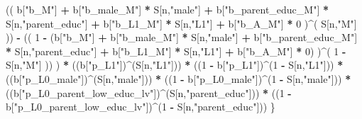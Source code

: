 \documentclass[
]{book}
\newenvironment{Shaded}{\begin{snugshade}}{\end{snugshade}}
\newcommand{\DecValTok}[1]{\textcolor[rgb]{0.00,0.00,0.81}{#1}}
\newcommand{\NormalTok}[1]{#1}
\newcommand{\SpecialCharTok}[1]{\textcolor[rgb]{0.81,0.36,0.00}{\textbf{#1}}}
\newcommand{\StringTok}[1]{\textcolor[rgb]{0.31,0.60,0.02}{#1}}
\begin{document}
\begin{Shaded}
\begin{Highlighting}[]
\NormalTok{          (( b[}\StringTok{"b\_M"}\NormalTok{] }\SpecialCharTok{+} 
\NormalTok{               b[}\StringTok{"b\_male\_M"}\NormalTok{] }\SpecialCharTok{*}\NormalTok{ S[n,}\StringTok{"male"}\NormalTok{] }\SpecialCharTok{+} 
\NormalTok{               b[}\StringTok{"b\_parent\_educ\_M"}\NormalTok{] }\SpecialCharTok{*}\NormalTok{ S[n,}\StringTok{"parent\_educ"}\NormalTok{] }\SpecialCharTok{+} 
\NormalTok{               b[}\StringTok{"b\_L1\_M"}\NormalTok{] }\SpecialCharTok{*}\NormalTok{ S[n,}\StringTok{"L1"}\NormalTok{] }\SpecialCharTok{+}
\NormalTok{               b[}\StringTok{"b\_A\_M"}\NormalTok{] }\SpecialCharTok{*} \DecValTok{0}\NormalTok{ )}\SpecialCharTok{\^{}}\NormalTok{( S[n,}\StringTok{"M"}\NormalTok{] )) }\SpecialCharTok{{-}} 
\NormalTok{          (( }\DecValTok{1} \SpecialCharTok{{-}}\NormalTok{ (b[}\StringTok{"b\_M"}\NormalTok{] }\SpecialCharTok{+} 
\NormalTok{                    b[}\StringTok{"b\_male\_M"}\NormalTok{] }\SpecialCharTok{*}\NormalTok{ S[n,}\StringTok{"male"}\NormalTok{] }\SpecialCharTok{+} 
\NormalTok{                    b[}\StringTok{"b\_parent\_educ\_M"}\NormalTok{] }\SpecialCharTok{*}\NormalTok{ S[n,}\StringTok{"parent\_educ"}\NormalTok{] }\SpecialCharTok{+} 
\NormalTok{                    b[}\StringTok{"b\_L1\_M"}\NormalTok{] }\SpecialCharTok{*}\NormalTok{ S[n,}\StringTok{"L1"}\NormalTok{] }\SpecialCharTok{+}
\NormalTok{                    b[}\StringTok{"b\_A\_M"}\NormalTok{] }\SpecialCharTok{*} \DecValTok{0}\NormalTok{) )}\SpecialCharTok{\^{}}\NormalTok{( }\DecValTok{1} \SpecialCharTok{{-}}\NormalTok{ S[n,}\StringTok{"M"}\NormalTok{] )) ) }\SpecialCharTok{*}
\NormalTok{      ((b[}\StringTok{"p\_L1"}\NormalTok{])}\SpecialCharTok{\^{}}\NormalTok{(S[n,}\StringTok{"L1"}\NormalTok{])) }\SpecialCharTok{*}
\NormalTok{      ((}\DecValTok{1} \SpecialCharTok{{-}}\NormalTok{ b[}\StringTok{"p\_L1"}\NormalTok{])}\SpecialCharTok{\^{}}\NormalTok{(}\DecValTok{1} \SpecialCharTok{{-}}\NormalTok{ S[n,}\StringTok{"L1"}\NormalTok{])) }\SpecialCharTok{*}
\NormalTok{      ((b[}\StringTok{"p\_L0\_male"}\NormalTok{])}\SpecialCharTok{\^{}}\NormalTok{(S[n,}\StringTok{"male"}\NormalTok{])) }\SpecialCharTok{*} 
\NormalTok{      ((}\DecValTok{1} \SpecialCharTok{{-}}\NormalTok{ b[}\StringTok{"p\_L0\_male"}\NormalTok{])}\SpecialCharTok{\^{}}\NormalTok{(}\DecValTok{1} \SpecialCharTok{{-}}\NormalTok{ S[n,}\StringTok{"male"}\NormalTok{])) }\SpecialCharTok{*} 
\NormalTok{      ((b[}\StringTok{"p\_L0\_parent\_low\_educ\_lv"}\NormalTok{])}\SpecialCharTok{\^{}}\NormalTok{(S[n,}\StringTok{"parent\_educ"}\NormalTok{])) }\SpecialCharTok{*}
\NormalTok{      ((}\DecValTok{1} \SpecialCharTok{{-}}\NormalTok{ b[}\StringTok{"p\_L0\_parent\_low\_educ\_lv"}\NormalTok{])}\SpecialCharTok{\^{}}\NormalTok{(}\DecValTok{1} \SpecialCharTok{{-}}\NormalTok{ S[n,}\StringTok{"parent\_educ"}\NormalTok{])) }
\NormalTok{    \}}
  

\end{Highlighting}
\end{Shaded}
\end{document}
